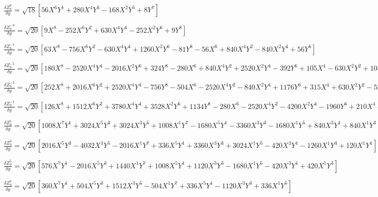 \documentclass[10pt,landscape]{article}
\begin{document}
\vspace{1.2 mm}
\noindent $ \frac{\delta Z^{8}_{8}}{\delta y} = \sqrt{18} [56X^{6}Y^{1} +280X^{4}Y^{3} -168X^{2}Y^{5} +8Y^{7}] $

\vspace{1.2 mm}
\noindent $ \frac{\delta Z^{-9}_{9}}{\delta y} = \sqrt{20} [9X^{8} -252X^{6}Y^{2} +630X^{4}Y^{4} -252X^{2}Y^{6} +9Y^{8}] $

\vspace{1.2 mm}
\noindent $ \frac{\delta Z^{-7}_{9}}{\delta y} = \sqrt{20} [63X^{8} -756X^{6}Y^{2} -630X^{4}Y^{4} +1260X^{2}Y^{6} -81Y^{8} -56X^{6} +840X^{4}Y^{2} -840X^{2}Y^{4} +56Y^{6}] $

\vspace{1.2 mm}
\noindent $ \frac{\delta Z^{-5}_{9}}{\delta y} = \sqrt{20} [180X^{8} -2520X^{4}Y^{4} -2016X^{2}Y^{6} +324Y^{8} -280X^{6} +840X^{4}Y^{2} +2520X^{2}Y^{4} -392Y^{6} +105X^{4} -630X^{2}Y^{2} +105Y^{4}] $

\vspace{1.2 mm}
\noindent $ \frac{\delta Z^{-3}_{9}}{\delta y} = \sqrt{20} [252X^{8} +2016X^{6}Y^{2} +2520X^{4}Y^{4} -756Y^{8} -504X^{6} -2520X^{4}Y^{2} -840X^{2}Y^{4} +1176Y^{6} +315X^{4} +630X^{2}Y^{2} -525Y^{4} -60X^{2} +60Y^{2}] $

\vspace{1.2 mm}
\noindent $ \frac{\delta Z^{-1}_{9}}{\delta y} = \sqrt{20} [126X^{8} +1512X^{6}Y^{2} +3780X^{4}Y^{4} +3528X^{2}Y^{6} +1134Y^{8} -280X^{6} -2520X^{4}Y^{2} -4200X^{2}Y^{4} -1960Y^{6} +210X^{4} +1260X^{2}Y^{2} +1050Y^{4} -60X^{2} -180Y^{2} +5] $

\vspace{1.2 mm}
\noindent $ \frac{\delta Z^{1}_{9}}{\delta y} = \sqrt{20} [1008X^{7}Y^{1} +3024X^{5}Y^{3} +3024X^{3}Y^{5} +1008X^{1}Y^{7} -1680X^{5}Y^{1} -3360X^{3}Y^{3} -1680X^{1}Y^{5} +840X^{3}Y^{1} +840X^{1}Y^{3} -120X^{1}Y^{1}] $

\vspace{1.2 mm}
\noindent $ \frac{\delta Z^{3}_{9}}{\delta y} = \sqrt{20} [2016X^{5}Y^{3} -4032X^{3}Y^{5} -2016X^{1}Y^{7} +336X^{5}Y^{1} +3360X^{3}Y^{3} +3024X^{1}Y^{5} -420X^{3}Y^{1} -1260X^{1}Y^{3} +120X^{1}Y^{1}] $

\vspace{1.2 mm}
\noindent $ \frac{\delta Z^{5}_{9}}{\delta y} = \sqrt{20} [576X^{7}Y^{1} -2016X^{5}Y^{3} +1440X^{1}Y^{7} +1008X^{5}Y^{1} +1120X^{3}Y^{3} -1680X^{1}Y^{5} -420X^{3}Y^{1} +420X^{1}Y^{3}] $

\vspace{1.2 mm}
\noindent $ \frac{\delta Z^{7}_{9}}{\delta y} = \sqrt{20} [360X^{7}Y^{1} +504X^{5}Y^{3} +1512X^{3}Y^{5} -504X^{1}Y^{7} +336X^{5}Y^{1} -1120X^{3}Y^{3} +336X^{1}Y^{5}] $
\end{document}
